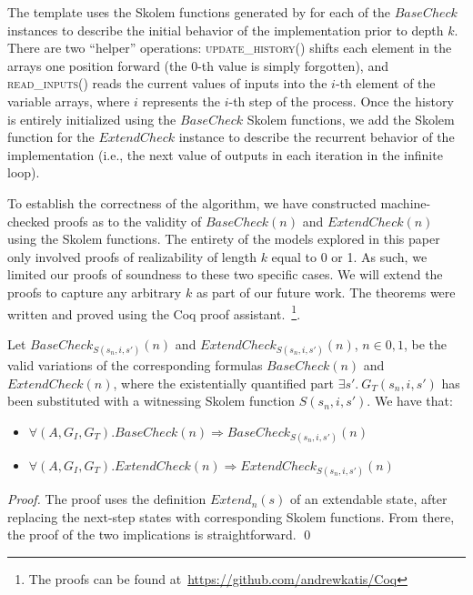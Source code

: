 The template uses the Skolem functions generated by \aeval for each
of the $\mathit{BaseCheck}$ instances to describe the initial behavior of
the implementation prior to depth $k$.  %
There are two ``helper'' operations:
\textsc{update\_history()} shifts each element in the arrays one position
forward (the 0-th value is simply forgotten), and \textsc{read\_inputs()} reads the
current values of inputs into the $i$-th element of the variable arrays,
where $i$ represents the $i$-th step of the process.
Once the history is entirely initialized using the $\mathit{BaseCheck}$ Skolem functions,
we add the Skolem function for the $\mathit{ExtendCheck}$ instance to describe the
recurrent behavior of the implementation (i.e., the next value of outputs in
each iteration in the infinite loop).

To establish the correctness of the algorithm,
we have constructed machine-checked proofs as to the validity of $\mathit{BaseCheck(n)}$ and
$\mathit{ExtendCheck(n)}$ using the Skolem functions.
The entirety of the models explored in
this paper only involved proofs of realizability of length $k$ equal to 0 or
1.
As such, we limited our proofs of soundness to these two specific cases. We will
extend the proofs to capture any arbitrary $k$ as part of our future work.
The theorems were written and proved using the Coq proof
assistant.~\footnote{The proofs can be found
at~\href{https://github.com/andrewkatis/Coq}{https://github.com/andrewkatis/Coq}}.

\begin{theorem} Let $\mathit{BaseCheck}_{S(s_n,i,s')}(n)$ and
$\mathit{ExtendCheck}_{S(s_n,i,s')}(n)$, $n \in {0,1}$, be the valid
variations of the corresponding formulas $\mathit{BaseCheck(n)}$ and
$\mathit{ExtendCheck(n)}$, where the existentially quantified part $\exists s'.~
G_T(s_n, i, s')$ has been substituted with a witnessing Skolem function
$S(s_n,i,s')$.  We have that:
\begin{itemize}
\item $\forall (A,G_{I},G_{T}). \mathit{BaseCheck}(n) \Rightarrow \mathit{BaseCheck}_{S(s_n,i,s')}(n)$
\item $\forall (A,G_{I},G_{T}). \mathit{ExtendCheck}(n) \Rightarrow
ExtendCheck_{S(s_n,i,s')}(n)$
\end{itemize}
\end{theorem}
\begin{proof}
The proof uses the definition $\mathit{Extend}_n(s)$ of an extendable state,
after replacing the next-step states with corresponding Skolem functions. From there,
the proof of the two implications is straightforward.
\qed
\end{proof}


